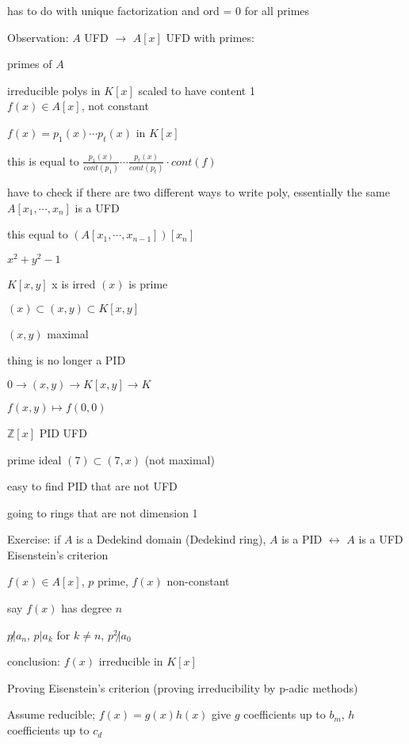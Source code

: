 \documentclass[12pt]{article}
\begin{document}
has to do with unique factorization and ord = 0 for all primes

\noindent
Observation: $A$ UFD $\to$ $A[x]$ UFD with primes:

primes of $A$

irreducible polys in $K[x]$ scaled to have content 1\\

\noindent
$f(x) \in A[x]$, not constant

$f(x) = p_1(x) \cdots p_t(x)$ in $K[x]$

this is equal to $\frac{p_1(x)}{cont(p_1)} \cdots \frac{p_t(x)}{cont(p_t)} \cdot cont(f)$

have to check if there are two different ways to write poly, essentially the same\\

\noindent
$A[x_1, \cdots, x_n]$ is a UFD

this equal to $(A[x_1, \cdots, x_{n - 1}])[x_n]$

$x^2 + y^2 - 1$

$K[x, y]$ x is irred $(x)$ is prime

$(x) \subset (x, y) \subset K[x, y]$

$(x, y)$ maximal

thing is no longer a PID

$0 \to (x, y) \to K[x, y] \to K$

$f(x, y) \mapsto f(0, 0)$

$\mathds{Z}[x]$ PID UFD 

prime ideal $(7) \subset (7, x)$ (not maximal)

easy to find PID that are not UFD

going to rings that are not dimension 1

\noindent
Exercise: if $A$ is a Dedekind domain (Dedekind ring), $A$ is a PID $\leftrightarrow$ $A$ is a UFD\\

\noindent
Eisenstein's criterion

$f(x) \in A[x]$, $p$ prime, $f(x)$ non-constant

say $f(x)$ has degree $n$

$p \not | a_n$, $p | a_k$ for $k \neq n$, $p^2 \not | a_0$

conclusion: $f(x)$ irreducible in $K[x]$

\noindent
Proving Eisenstein's criterion (proving irreducibility by p-adic methods)

Assume reducible; $f(x) = g(x)h(x)$ give $g$ coefficients up to $b_m$, $h$ coefficients up to $c_d$
\end{document}
